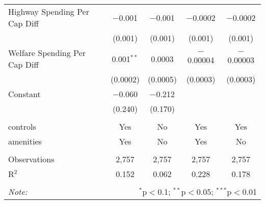 \begin{table}[!htbp]
\begin{tabular}{@{\extracolsep{5pt}}lcccc}
  Highway Spending Per Cap Diff & $-$0.001 & $-$0.001 & $-$0.0002 & $-$0.0002 \\ 
  & (0.001) & (0.001) & (0.001) & (0.001) \\ 
  Welfare Spending Per Cap Diff & 0.001$^{**}$ & 0.0003 & $-$0.00004 & $-$0.00003 \\ 
  & (0.0002) & (0.0005) & (0.0003) & (0.0003) \\ 
  Constant & $-$0.060 & $-$0.212 &  &  \\ 
  & (0.240) & (0.170) &  &  \\ 
 \hline \\[-1.8ex] 
controls & Yes & No & Yes & Yes \\ 
amenities & Yes & No & Yes & No \\ 
\hline \\[-1.8ex] 
Observations & 2,757 & 2,757 & 2,757 & 2,757 \\ 
R$^{2}$ & 0.152 & 0.062 & 0.228 & 0.178 \\ 
\hline 
\hline \\[-1.8ex] 
\textit{Note:}  & \multicolumn{4}{r}{$^{*}$p$<$0.1; $^{**}$p$<$0.05; $^{***}$p$<$0.01} \\ 
\end{tabular} 
\end{table} 
